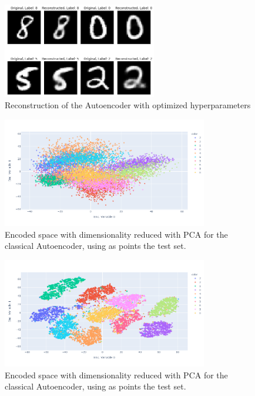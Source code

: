 \begin{figure}[h]
    \centering
    \includegraphics[width=0.6\textwidth]{Images/reconstr_im.png}
    \caption{Reconstruction of the Autoencoder with optimized hyperparameters}
    \label{fig:rec}
\end{figure}

\begin{figure}[h]
    \centering
    \includegraphics[width=0.8\textwidth]{Images/autoenc_PCA.png}
    \caption{Encoded space with dimensionality reduced with PCA for the classical Autoencoder, using as points the test set.}
    \label{fig:aut_PCA}
\end{figure}

\begin{figure}[h]
    \centering
    \includegraphics[width=0.8\textwidth]{Images/autoenc_tsne.png}
    \caption{Encoded space with dimensionality reduced with PCA for the classical Autoencoder, using as points the test set.}
    \label{fig:aut_TSNE}
\end{figure}

